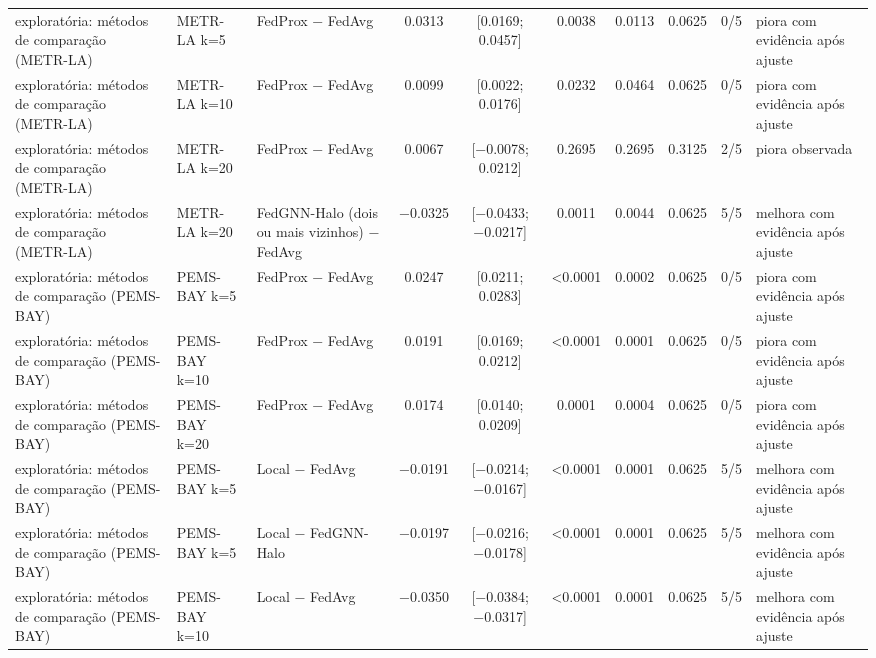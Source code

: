 \begin{tabular}{lllccccccl}
exploratória: métodos de comparação (METR-LA) & METR-LA k=5 & FedProx − FedAvg & \num{+0.0313} & [\num{+0.0169}; \num{+0.0457}] & \num{0.0038} & \num{0.0113} & \num{0.0625} & 0/5 & piora com evidência após ajuste \\
exploratória: métodos de comparação (METR-LA) & METR-LA k=10 & FedProx − FedAvg & \num{+0.0099} & [\num{+0.0022}; \num{+0.0176}] & \num{0.0232} & \num{0.0464} & \num{0.0625} & 0/5 & piora com evidência após ajuste \\
exploratória: métodos de comparação (METR-LA) & METR-LA k=20 & FedProx − FedAvg & \num{+0.0067} & [\num{-0.0078}; \num{+0.0212}] & \num{0.2695} & \num{0.2695} & \num{0.3125} & 2/5 & piora observada \\
exploratória: métodos de comparação (METR-LA) & METR-LA k=20 & FedGNN-Halo (dois ou mais vizinhos) − FedAvg & \num{-0.0325} & [\num{-0.0433}; \num{-0.0217}] & \num{0.0011} & \num{0.0044} & \num{0.0625} & 5/5 & melhora com evidência após ajuste \\
exploratória: métodos de comparação (PEMS-BAY) & PEMS-BAY k=5 & FedProx − FedAvg & \num{+0.0247} & [\num{+0.0211}; \num{+0.0283}] & \num{<0.0001} & \num{0.0002} & \num{0.0625} & 0/5 & piora com evidência após ajuste \\
exploratória: métodos de comparação (PEMS-BAY) & PEMS-BAY k=10 & FedProx − FedAvg & \num{+0.0191} & [\num{+0.0169}; \num{+0.0212}] & \num{<0.0001} & \num{0.0001} & \num{0.0625} & 0/5 & piora com evidência após ajuste \\
exploratória: métodos de comparação (PEMS-BAY) & PEMS-BAY k=20 & FedProx − FedAvg & \num{+0.0174} & [\num{+0.0140}; \num{+0.0209}] & \num{0.0001} & \num{0.0004} & \num{0.0625} & 0/5 & piora com evidência após ajuste \\
exploratória: métodos de comparação (PEMS-BAY) & PEMS-BAY k=5 & Local − FedAvg & \num{-0.0191} & [\num{-0.0214}; \num{-0.0167}] & \num{<0.0001} & \num{0.0001} & \num{0.0625} & 5/5 & melhora com evidência após ajuste \\
exploratória: métodos de comparação (PEMS-BAY) & PEMS-BAY k=5 & Local − FedGNN-Halo & \num{-0.0197} & [\num{-0.0216}; \num{-0.0178}] & \num{<0.0001} & \num{0.0001} & \num{0.0625} & 5/5 & melhora com evidência após ajuste \\
exploratória: métodos de comparação (PEMS-BAY) & PEMS-BAY k=10 & Local − FedAvg & \num{-0.0350} & [\num{-0.0384}; \num{-0.0317}] & \num{<0.0001} & \num{0.0001} & \num{0.0625} & 5/5 & melhora com evidência após ajuste \\

\end{tabular}
